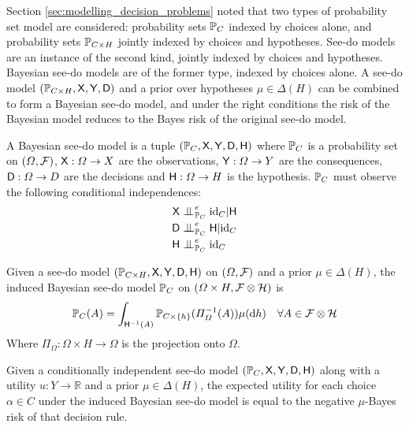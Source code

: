 Section \ref{sec:modelling_decision_problems} noted that two types of probability set model are considered: probability sets $\mathbb{P}_C$ indexed by choices alone, and probability sets $\mathbb{P}_{C\times H}$ jointly indexed by choices and hypotheses. See-do models are an instance of the second kind, jointly indexed by choices and hypotheses. Bayesian see-do models are of the former type, indexed by choices alone. A see-do model $(\mathbb{P}_{C\times H}, \mathsf{X},\mathsf{Y},\mathsf{D})$ and a prior over hypotheses $\mu\in \Delta(H)$ can be combined to form a Bayesian see-do model, and under the right conditions the risk of the Bayesian model reduces to the Bayes risk of the original see-do model.

\begin{definition}
A Bayesian see-do model is a tuple $(\mathbb{P}_{C}, \mathsf{X},\mathsf{Y},\mathsf{D},\mathsf{H})$ where $\mathbb{P}_C$ is a probability set on $(\Omega,\mathcal{F})$, $\mathsf{X}:\Omega\to X$ are the observations, $\mathsf{Y}:\Omega\to Y$ are the consequences, $\mathsf{D}:\Omega\to D$ are the decisions and $\mathsf{H}:\Omega\to H$ is the hypothesis. $\mathbb{P}_C$ must observe the following conditional independences:
\begin{align}
    \RV{X}&\CI^e_{\prob{P}_{C}} \text{id}_C|\RV{H}\\
    \RV{D}&\CI^e_{\prob{P}_{C}} \RV{H}|\text{id}_C\\
    \RV{H}&\CI^e_{\prob{P}_C} \text{id}_C
\end{align}
\end{definition}

\begin{definition}
Given a see-do model $(\mathbb{P}_{C\times H}, \mathsf{X},\mathsf{Y},\mathsf{D},\mathsf{H})$ on $(\Omega,\mathcal{F})$ and a prior $\mu\in \Delta(H)$, the induced Bayesian see-do model $\mathbb{P}_C$ on $(\Omega\times H,\mathcal{F}\otimes \mathcal{H})$ is
\begin{align}
    \mathbb{P}_C(A) &= \int_{\mathsf{H}^{-1}(A)} \mathbb{P}_{C\times \{h\}}(\Pi_{\Omega}^{-1}(A))\mu(\mathrm{d}h)&\forall A\in \mathcal{F}\otimes\mathcal{H}
\end{align}
Where $\Pi_\Omega:\Omega\times H\to \Omega$ is the projection onto $\Omega$.
\end{definition}

\begin{theorem}
Given a conditionally independent see-do model $(\mathbb{P}_{C}, \mathsf{X},\mathsf{Y},\mathsf{D},\mathsf{H})$ along with a utility $u:Y\to \mathbb{R}$ and a prior $\mu\in \Delta(H)$, the expected utility for each choice $\alpha\in C$ under the induced Bayesian see-do model is equal to the negative $\mu$-Bayes risk of that decision rule.
\end{theorem}

